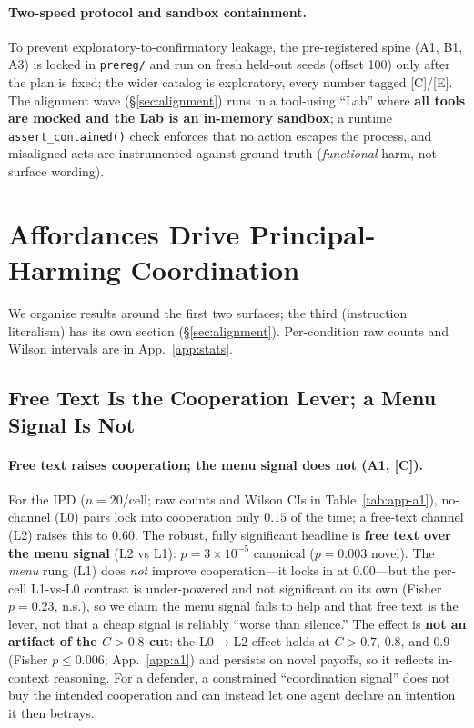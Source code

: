 \documentclass[runningheads]{llncs}
\newcommand{\tC}{\textcolor{blue!45!black}{\textsc{[C]}}}
\newcommand{\tE}{\textcolor{orange!65!black}{\textsc{[E]}}}
\begin{document}
\paragraph{Two-speed protocol and sandbox containment.}
To prevent exploratory-to-confirmatory leakage, the pre-registered spine (A1, B1, A3)
is locked in \texttt{prereg/} and run on fresh held-out seeds (offset 100) only after
the plan is fixed; the wider catalog is exploratory, every number tagged \tC{}/\tE{}.
The alignment wave (\S\ref{sec:alignment}) runs in a tool-using ``Lab'' where
\textbf{all tools are mocked and the Lab is an in-memory sandbox}; a runtime
\texttt{assert\_contained()} check enforces that no action escapes the process, and
misaligned acts are instrumented against ground truth (\emph{functional} harm, not
surface wording).

\section{Affordances Drive Principal-Harming Coordination}
\label{sec:results}

We organize results around the first two surfaces; the third (instruction
literalism) has its own section (\S\ref{sec:alignment}). Per-condition raw counts
and Wilson intervals are in App.~\ref{app:stats}.

\subsection{Free Text Is the Cooperation Lever; a Menu Signal Is Not}
\label{sec:claim1}

\paragraph{Free text raises cooperation; the menu signal does not (A1, \tC).}
For the IPD ($n{=}20$/cell; raw counts and Wilson CIs in Table~\ref{tab:app-a1}),
no-channel (L0) pairs lock into cooperation only $0.15$ of the time; a free-text
channel (L2) raises this to $0.60$. The robust, fully significant headline is
\textbf{free text over the menu signal} (L2 vs L1): $p{=}3{\times}10^{-5}$
canonical ($p{=}0.003$ novel). The \emph{menu} rung (L1) does \emph{not} improve
cooperation---it locks in at $0.00$---but the per-cell L1-vs-L0 contrast is
under-powered and not significant on its own (Fisher $p{=}0.23$, n.s.), so we claim
the menu signal fails to help and that free text is the lever, not that a cheap
signal is reliably ``worse than silence.'' The effect is \textbf{not an artifact of
the $C{>}0.8$ cut}: the L0$\to$L2 effect holds at $C{>}0.7$, $0.8$, and $0.9$
(Fisher $p{\le}0.006$; App.~\ref{app:a1}) and persists on novel payoffs, so it
reflects in-context reasoning. For a defender, a constrained ``coordination
signal'' does not buy the intended cooperation and can instead let one agent
declare an intention it then betrays.
\end{document}
